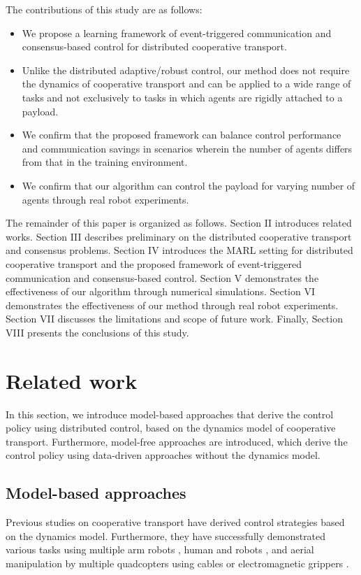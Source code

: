 \documentclass[letterpaper, 10 pt, conference]{ieeeconf} %
\begin{document}
The contributions of this study are as follows:
\begin{itemize}
\item We propose a learning framework of event-triggered communication and consensus-based control for distributed cooperative transport.
\item Unlike the distributed adaptive/robust control, our method does not require the dynamics of cooperative transport and can be applied to a wide range of tasks and not exclusively to tasks in which agents are rigidly attached to a payload.
\item We confirm that the proposed framework can balance control performance and communication savings in scenarios wherein the number of agents differs from that in the training environment.
\item We confirm that our algorithm can control the payload for varying number of agents through real robot experiments.
\end{itemize}

The remainder of this paper is organized as follows.
Section II introduces related works. Section III describes preliminary on the distributed cooperative transport and consensus problems.
Section IV introduces the MARL setting for distributed cooperative transport and the proposed framework of event-triggered communication and consensus-based control.
Section V demonstrates the effectiveness of our algorithm through numerical simulations.
Section VI demonstrates the effectiveness of our method through real robot experiments.
Section VII discusses the limitations and scope of future work.
Finally, Section VIII presents the conclusions of this study.

\section{Related work}
In this section, we introduce model-based approaches that derive the control policy using distributed control, based on the dynamics model of cooperative transport. Furthermore, model-free approaches are introduced, which derive the control policy using data-driven approaches without the dynamics model.

\subsection{Model-based approaches} 
Previous studies on cooperative transport have derived control strategies based on the dynamics model. Furthermore, they have successfully
demonstrated various tasks using multiple arm robots \cite{WangICRA2016, WangIJRR2016}, human and robots \cite{Sieber2015, Gienger2018}, and aerial manipulation by multiple quadcopters using cables \cite{Michael2011, Jiang2013, Sreenath2013} or electromagnetic grippers \cite{Mellinger2013, Loianno2018}.
\end{document}
